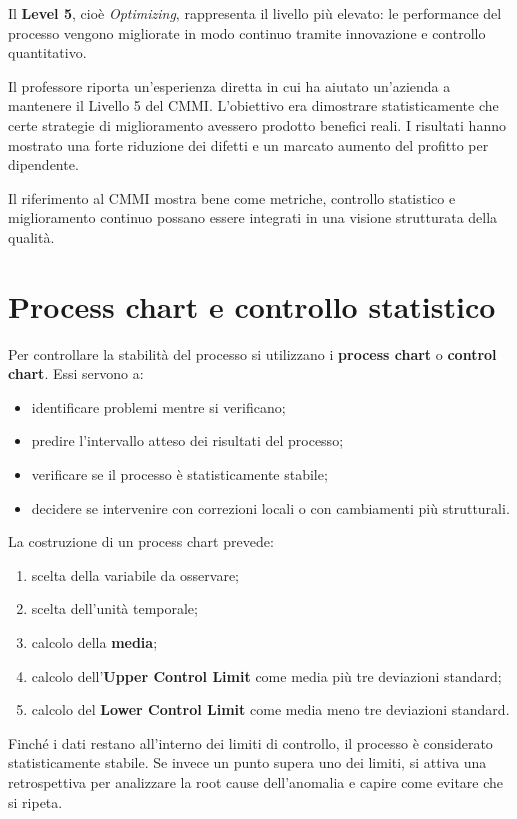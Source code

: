Il \textbf{Level 5}, cioè \emph{Optimizing}, rappresenta il livello più elevato: le performance del processo vengono migliorate in modo continuo tramite innovazione e controllo quantitativo.

\begin{notaprof}
Il professore riporta un'esperienza diretta in cui ha aiutato un'azienda a mantenere il Livello 5 del CMMI. L'obiettivo era dimostrare statisticamente che certe strategie di miglioramento avessero prodotto benefici reali. I risultati hanno mostrato una forte riduzione dei difetti e un marcato aumento del profitto per dipendente.
\end{notaprof}

Il riferimento al CMMI mostra bene come metriche, controllo statistico e miglioramento continuo possano essere integrati in una visione strutturata della qualità.

\section{Process chart e controllo statistico}

Per controllare la stabilità del processo si utilizzano i \textbf{process chart} o \textbf{control chart}. Essi servono a:
\begin{itemize}
    \item identificare problemi mentre si verificano;
    \item predire l'intervallo atteso dei risultati del processo;
    \item verificare se il processo è statisticamente stabile;
    \item decidere se intervenire con correzioni locali o con cambiamenti più strutturali.
\end{itemize}

La costruzione di un process chart prevede:
\begin{enumerate}
    \item scelta della variabile da osservare;
    \item scelta dell'unità temporale;
    \item calcolo della \textbf{media};
    \item calcolo dell'\textbf{Upper Control Limit} come media più tre deviazioni standard;
    \item calcolo del \textbf{Lower Control Limit} come media meno tre deviazioni standard.
\end{enumerate}

\begin{notaprof}
Finché i dati restano all'interno dei limiti di controllo, il processo è considerato statisticamente stabile. Se invece un punto supera uno dei limiti, si attiva una retrospettiva per analizzare la root cause dell'anomalia e capire come evitare che si ripeta.
\end{notaprof}

